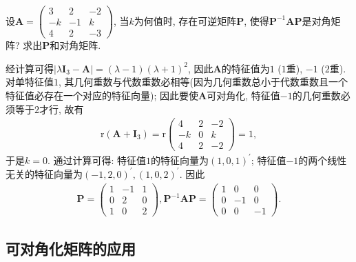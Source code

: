 \documentclass[../../main.tex]{subfiles}%
\begin{document}
\begin{example}
设\(\boldsymbol{A}=\begin{pmatrix}
3&2&-2\\
-k&-1&k\\
4&2&-3
\end{pmatrix}\), 当\(k\)为何值时, 存在可逆矩阵\(\boldsymbol{P}\), 使得\(\boldsymbol{P}^{-1}\boldsymbol{AP}\)是对角矩阵? 求出\(\boldsymbol{P}\)和对角矩阵.
\end{example}
\begin{solution}

经计算可得\(\vert\lambda\boldsymbol{I}_{3}-\boldsymbol{A}\vert = (\lambda - 1)(\lambda + 1)^{2}\), 因此\(\boldsymbol{A}\)的特征值为\(1\) (\(1\)重), \(-1\) (\(2\)重). 对单特征值\(1\), 其几何重数与代数重数必相等(因为几何重数总小于代数重数且一个特征值必存在一个对应的特征向量); 因此要使\(\boldsymbol{A}\)可对角化, 特征值\(-1\)的几何重数必须等于\(2\)才行, 故有
\begin{align*}
\mathrm{r}(\boldsymbol{A}+\boldsymbol{I}_{3})=\mathrm{r}\begin{pmatrix}
4&2&-2\\
-k&0&k\\
4&2&-2
\end{pmatrix}=1,
\end{align*}
于是\(k = 0\). 通过计算可得: 特征值\(1\)的特征向量为\((1,0,1)^{\prime}\); 特征值\(-1\)的两个线性无关的特征向量为\((-1,2,0)^{\prime},(1,0,2)^{\prime}\). 因此
\begin{align*}
\boldsymbol{P}=\begin{pmatrix}
1&-1&1\\
0&2&0\\
1&0&2
\end{pmatrix}, \boldsymbol{P}^{-1}\boldsymbol{AP}=\begin{pmatrix}
1&0&0\\
0&-1&0\\
0&0&-1
\end{pmatrix}. 
\end{align*} 

\end{solution}

\subsection{可对角化矩阵的应用}
\end{document}
